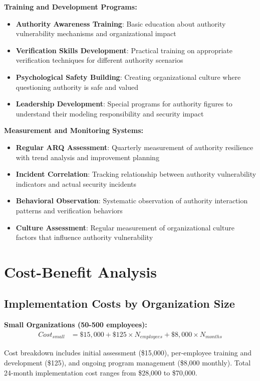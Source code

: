 \documentclass[11pt,a4paper]{article}
\begin{document}
\textbf{Training and Development Programs:}
\begin{itemize}
\item \textbf{Authority Awareness Training}: Basic education about authority vulnerability mechanisms and organizational impact
\item \textbf{Verification Skills Development}: Practical training on appropriate verification techniques for different authority scenarios
\item \textbf{Psychological Safety Building}: Creating organizational culture where questioning authority is safe and valued
\item \textbf{Leadership Development}: Special programs for authority figures to understand their modeling responsibility and security impact
\end{itemize}

\textbf{Measurement and Monitoring Systems:}
\begin{itemize}
\item \textbf{Regular ARQ Assessment}: Quarterly measurement of authority resilience with trend analysis and improvement planning
\item \textbf{Incident Correlation}: Tracking relationship between authority vulnerability indicators and actual security incidents
\item \textbf{Behavioral Observation}: Systematic observation of authority interaction patterns and verification behaviors
\item \textbf{Culture Assessment}: Regular measurement of organizational culture factors that influence authority vulnerability
\end{itemize}

\section{Cost-Benefit Analysis}

\subsection{Implementation Costs by Organization Size}

\textbf{Small Organizations (50-500 employees):}
\begin{align}
Cost_{small} &= \$15,000 + \$125 \times N_{employees} + \$8,000 \times N_{months}
\end{align}

Cost breakdown includes initial assessment (\$15,000), per-employee training and development (\$125), and ongoing program management (\$8,000 monthly). Total 24-month implementation cost ranges from \$28,000 to \$70,000.
\end{document}

